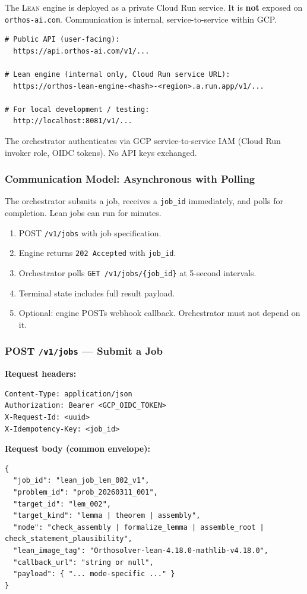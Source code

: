 \documentclass[11pt,a4paper]{article}
\newcommand{\Lean}{\textsc{Lean}}
\begin{document}
The \Lean{} engine is deployed as a private Cloud Run service. It is \textbf{not} exposed on \texttt{orthos-ai.com}. Communication is internal, service-to-service within GCP.

\begin{lstlisting}
# Public API (user-facing):
  https://api.orthos-ai.com/v1/...

# Lean engine (internal only, Cloud Run service URL):
  https://orthos-lean-engine-<hash>-<region>.a.run.app/v1/...

# For local development / testing:
  http://localhost:8081/v1/...
\end{lstlisting}

The orchestrator authenticates via GCP service-to-service IAM (Cloud Run invoker role, OIDC tokens). No API keys exchanged.

\subsubsection{Communication Model: Asynchronous with Polling}

The orchestrator submits a job, receives a \texttt{job\_id} immediately, and polls for completion. Lean jobs can run for minutes.

\begin{enumerate}[leftmargin=2em]
  \item POST \texttt{/v1/jobs} with job specification.
  \item Engine returns \texttt{202 Accepted} with \texttt{job\_id}.
  \item Orchestrator polls \texttt{GET /v1/jobs/\{job\_id\}} at 5-second intervals.
  \item Terminal state includes full result payload.
  \item Optional: engine POSTs webhook callback. Orchestrator must not depend on it.
\end{enumerate}

\subsubsection{POST \texttt{/v1/jobs} --- Submit a Job}

\textbf{Request headers:}
\begin{lstlisting}
Content-Type: application/json
Authorization: Bearer <GCP_OIDC_TOKEN>
X-Request-Id: <uuid>
X-Idempotency-Key: <job_id>
\end{lstlisting}

\textbf{Request body (common envelope):}
\begin{lstlisting}
{
  "job_id": "lean_job_lem_002_v1",
  "problem_id": "prob_20260311_001",
  "target_id": "lem_002",
  "target_kind": "lemma | theorem | assembly",
  "mode": "check_assembly | formalize_lemma | assemble_root | check_statement_plausibility",
  "lean_image_tag": "Orthosolver-lean-4.18.0-mathlib-v4.18.0",
  "callback_url": "string or null",
  "payload": { "... mode-specific ..." }
}
\end{lstlisting}
\end{document}
